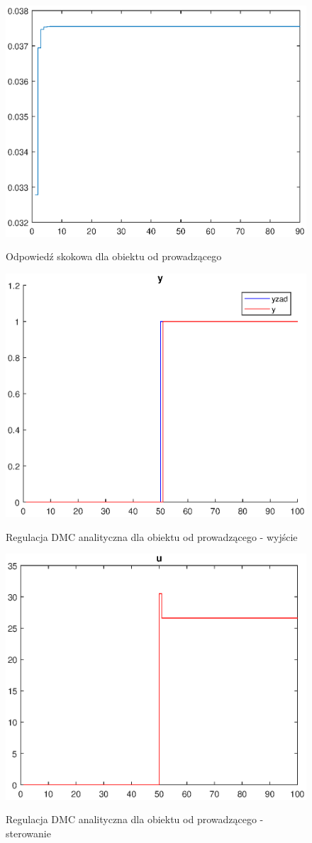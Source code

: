 \begin{figure}[h!]
	\centering
	\includegraphics[width=.7\linewidth]{img/skoks.eps}
	\label{ch2:skoks}
	\caption{Odpowiedź skokowa dla obiektu od prowadzącego}
\end{figure}
\begin{figure}[h!]
	\centering
	\includegraphics[width=.7\linewidth]{img/yS.eps}
	\label{ch2:dmcanas}
	\caption{Regulacja DMC analityczna dla obiektu od prowadzącego - wyjście}
\end{figure}
\begin{figure}[h!]
\centering
\includegraphics[width=.7\linewidth]{img/uS.eps}
\label{ch2:dmcanasters}
\caption{Regulacja DMC analityczna dla obiektu od prowadzącego - sterowanie}
\end{figure}

